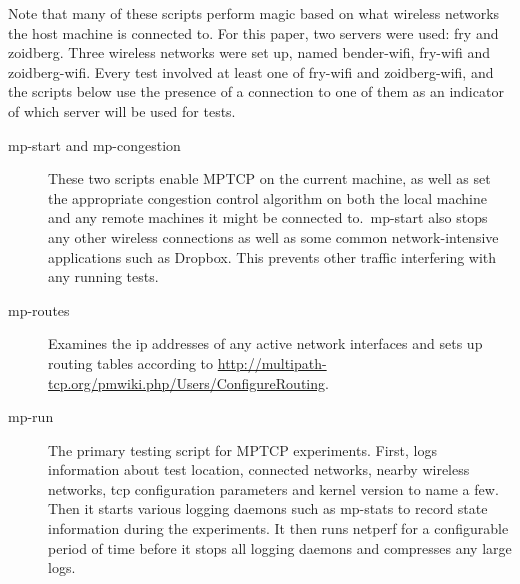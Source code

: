 Note that many of these scripts perform magic based on what wireless networks
the host machine is connected to. For this paper, two servers were used: fry and
zoidberg. Three wireless networks were set up, named bender-wifi, fry-wifi and 
zoidberg-wifi. Every test involved at least one of fry-wifi and zoidberg-wifi, 
and the scripts below use the presence of a connection to one of them as an 
indicator of which server will be used for tests.

\begin{description}
  \item[mp-start and mp-congestion]
    These two scripts enable MPTCP on the current machine, as well as set the
    appropriate congestion control algorithm on both the local machine and any
    remote machines it might be connected to.\ mp-start also stops any other
    wireless connections as well as some common network-intensive applications
    such as Dropbox. This prevents other traffic interfering with any running
    tests.
  \item[mp-routes]
    Examines the ip addresses of any active network interfaces and sets up
    routing tables according to
    \href{http://multipath-tcp.org/pmwiki.php/Users/ConfigureRouting}{http://multipath-tcp.org/\-pmwiki.php/\-Users/\-ConfigureRouting}.
  \item[mp-run]
    The primary testing script for MPTCP experiments. First, logs information
    about test location, connected networks, nearby wireless networks, tcp
    configuration parameters and kernel version to name a few. Then it starts 
    various logging daemons such as mp-stats to record state information during 
    the experiments. It then runs netperf for a configurable period of time 
    before it stops all logging daemons and compresses any large logs.


\end{description}
